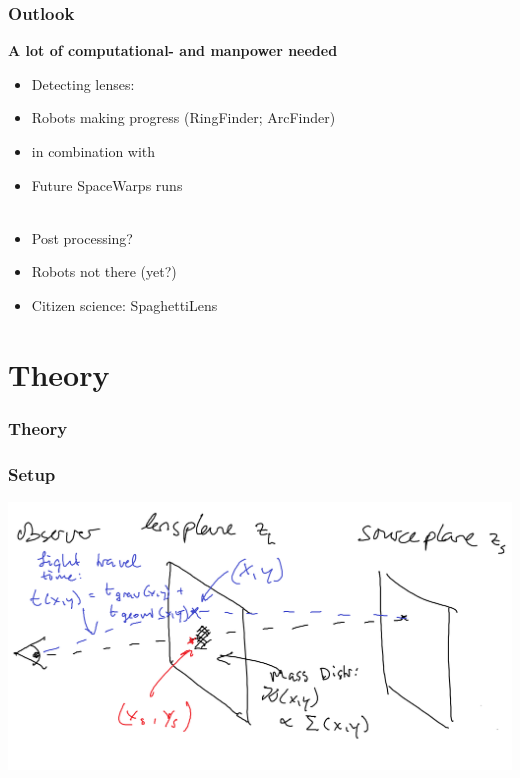 \documentclass{beamer}
\newcommand{\aitem}{\item[$\Rightarrow$]}
\newcommand{\nitem}{\item[]}
\begin{document}
\begin{frame}
  \frametitle{Outlook}
	
	\textbf{A lot of computational- and manpower needed}
	
  \begin{itemize}
			
		\nitem Detecting lenses:
		\item Robots making progress (RingFinder; ArcFinder)
		\nitem in combination with
		\item Future SpaceWarps runs \\~\\
		
		\nitem Post processing?
		\item Robots not there (yet?)
		\aitem Citizen science: SpaghettiLens

  \end{itemize}
\end{frame}




\section{Theory}
\begin{frame}
  \frametitle{Theory}

\end{frame}

\begin{frame}
	\frametitle{Setup}
	\includegraphics[width=\textwidth]{imgs/sketch_arrtime}
\end{frame}
\end{document}
